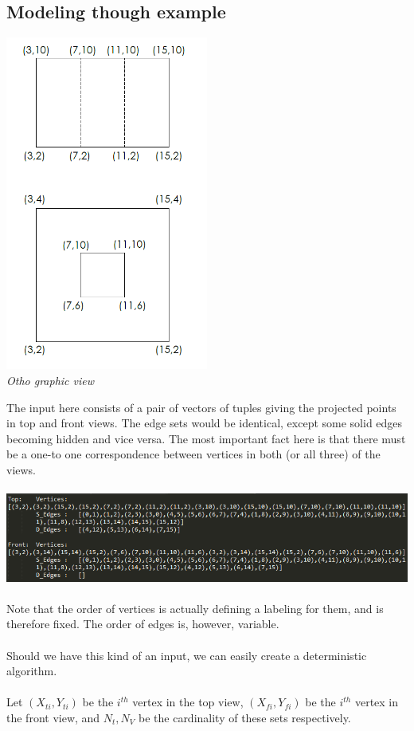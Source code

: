 \documentclass[
11pt, %
english, %
singlespacing, %
headsepline, %
]{MastersDoctoralThesis} %
\begin{document}
\subsection{Modeling though example}

\begin{center}
    \includegraphics[width=0.5\textwidth]{ortho}\\
    \emph{Otho graphic view}
\end{center}
The input here consists of a pair of vectors of tuples giving the projected points in top and front views. The edge sets would be identical, except some solid edges becoming hidden and vice versa. The most important fact here is that there must be a one-to one correspondence between vertices in both (or all three) of the views.\\ \\
\includegraphics[width=\textwidth]{2d-3d-3}\\ \\
Note that the order of vertices is actually defining a labeling for them, and is therefore fixed. The order of edges is, however, variable.\\ \\
Should we have this kind of an input, we can easily create a deterministic algorithm. \\ \\
Let $(X_{ti}, Y_{ti})$ be the $i^{th}$ vertex in the top view, $(X_{fi}, Y_{fi})$ be the $i^{th}$ vertex in the front view, and $N_t, N_V$ be the cardinality of these sets respectively.
\end{document}
